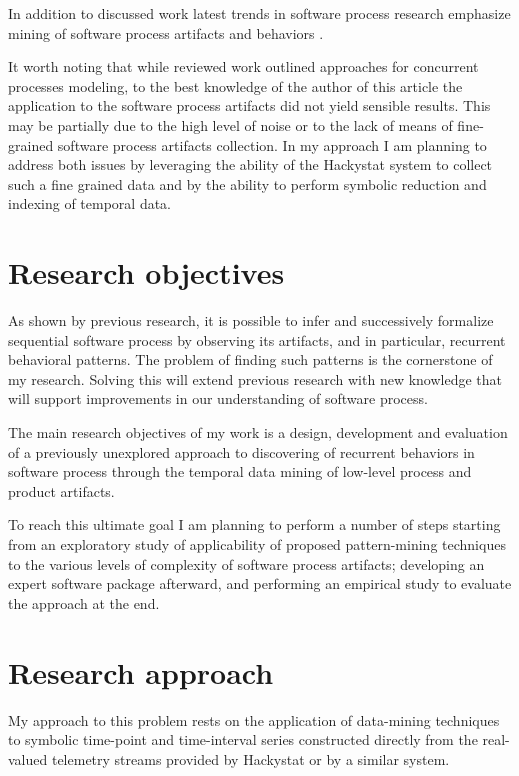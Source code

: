 \documentclass{sig-alternate}
\begin{document}
In addition to discussed work latest trends in software process research emphasize mining of software process artifacts and behaviors \cite{citeulike:5043664} \cite{citeulike:5112229}. 

It worth noting that while reviewed work outlined approaches for concurrent processes modeling, to the best knowledge of the author of this article the application to the software process artifacts did not yield sensible results. This may be partially due to the high level of noise or to the lack of means of fine-grained software process artifacts collection. In my approach I am planning to address both issues by leveraging the ability of the Hackystat system \cite{citeulike:4041809} to collect such a fine grained data and by the ability to perform symbolic reduction and indexing of temporal data.

\section{Research objectives}
As shown by previous research, it is possible to infer and successively formalize sequential software process by observing its artifacts, and in particular, recurrent behavioral patterns. The problem of finding such patterns is the cornerstone of my research. Solving this will extend previous research with new knowledge that will support improvements in our understanding of software process.

The main research objectives of my work is a design, development and evaluation of a previously unexplored approach to discovering of recurrent behaviors in software process through the temporal data mining of low-level process and product artifacts. 

To reach this ultimate goal I am planning to perform a number of steps starting from an exploratory study of applicability of proposed pattern-mining techniques to the various levels of complexity of software process artifacts; developing an expert software package afterward, and performing an empirical study to evaluate the approach at the end.

\section{Research approach}
My approach to this problem rests on the application of data-mining techniques to symbolic time-point and time-interval series constructed directly from the real-valued telemetry streams provided by Hackystat or by a similar system.
\end{document}
